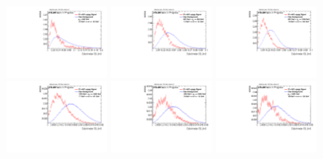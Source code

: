 \begin{figure}[H]
\includegraphics[width=0.3\textwidth]{sascha_input/Appendix/Distributions/w/distributions/beta2/h_recoJet_C2_2_bin1.pdf} \hspace{1mm}
\includegraphics[width=0.3\textwidth]{sascha_input/Appendix/Distributions/w/distributions/beta2/h_recoJet_C2_2_bin2.pdf} \hspace{1mm}
\includegraphics[width=0.3\textwidth]{sascha_input/Appendix/Distributions/w/distributions/beta2/h_recoJet_C2_2_bin3.pdf} 
\bigskip
\includegraphics[width=0.3\textwidth]{sascha_input/Appendix/Distributions/w/distributions/beta2/h_recoJet_C2_2_bin4.pdf} \hspace{1mm}
\includegraphics[width=0.3\textwidth]{sascha_input/Appendix/Distributions/w/distributions/beta2/h_recoJet_C2_2_bin5.pdf} \hspace{1mm}
\includegraphics[width=0.3\textwidth]{sascha_input/Appendix/Distributions/w/distributions/beta2/h_recoJet_C2_2_bin6.pdf}

\end{figure}
